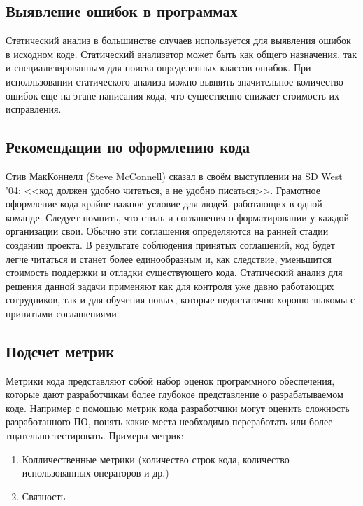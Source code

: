 \subsection {Выявление ошибок в программах}
Статический анализ в большинстве случаев используется для выявления ошибок в исходном коде.
Статический анализатор может быть как общего назначения, так и специализированным для поиска определенных 
классов ошибок. При исполльзовании статического анализа можно выявить значительное количество 
ошибок еще на этапе написания кода, что существенно снижает стоимость их исправления.
 

\subsection {Рекомендации по оформлению кода}
Стив МакКоннелл (Steve McConnell) сказал в своём выступлении на SD West '04: <<код должен удобно 
читаться, а не удобно писаться>>\cite{sdWest}. Грамотное оформление кода крайне важное условие для людей, работающих
в одной команде. Следует помнить, что стиль и соглашения о форматировании 
у каждой организации свои. Обычно эти соглашения определяются на ранней стадии создании проекта.
В результате соблюдения принятых соглашений, код будет легче читаться и станет более единообразным 
и, как следствие, уменьшится стоимость поддержки и отладки существующего кода.  
Статический анализ для решения данной\cite{codeAssist} задачи применяют как для контроля уже давно работающих сотрудников,
так и для обучения новых, которые недостаточно хорошо знакомы с принятыми соглашениями.

\subsection {Подсчет метрик}
Метрики кода представляют собой набор оценок программного обеспечения, которые дают разработчикам 
более глубокое представление о разрабатываемом коде.
Например с помощью метрик кода разработчики могут оценить сложность разработанного ПО,
понять какие места необходимо переработать или более тщательно тестировать. 
Примеры метрик:
\begin{enumerate}
	\item Колличественные метрики (количество строк кода, количество использованных операторов и др.)
	\item Связность
\end{enumerate}

